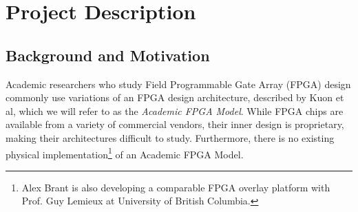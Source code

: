 \section{Project Description}

\subsection{Background and Motivation}

%
%
%

Academic researchers who study Field Programmable Gate Array (FPGA) design commonly use variations of an FPGA design architecture, described by Kuon et al\cite{fpga}, which we will refer to as the \emph{Academic FPGA Model}.
While FPGA chips are available from a variety of commercial vendors, their inner design is proprietary, making their architectures difficult to study.
Furthermore, there is no existing physical implementation\footnote{Alex Brant is also developing a comparable FPGA overlay platform with Prof. Guy Lemieux at University of British Columbia.} of an Academic FPGA Model.

